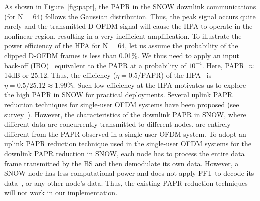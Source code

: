 As shown in Figure~\ref{fig:papr}, the PAPR in the SNOW downlink communications (for N = 64) follows the Gaussian distribution. Thus, the peak signal occurs quite rarely and the transmitted D-OFDM signal will cause the HPA to operate in the nonlinear region, resulting in a very inefficient amplification. To illustrate the power efficiency of the HPA for N = 64, let us assume the probability of the clipped D-OFDM frames is less than 0.01\%. We thus need to apply an input back-off (IBO)~\cite{baxley2004power} equivalent to the PAPR at a probability of $10^{-4}$. Here, PAPR $\approx$ 14dB or 25.12. Thus, the efficiency ($\eta = 0.5/\text{PAPR}$) of the HPA~\cite{jiang2008overview} is $\eta = 0.5/25.12 \approx 1.99\%$. Such low efficiency at the HPA motivates us to explore the high PAPR in SNOW for practical deployments.
Several uplink PAPR reduction techniques for single-user OFDM systems have been proposed (see survey~\cite{jiang2008overview}). However, the characteristics of the downlink PAPR in SNOW, where different data are concurrently transmitted to different nodes, are entirely different from the PAPR observed in a single-user OFDM system. To adopt an uplink PAPR reduction technique used in the single-user OFDM systems for the downlink PAPR reduction in SNOW, each node has to process the entire data frame transmitted by the BS and then demodulate its own data. However, a SNOW node has less computational power and does not apply FFT to decode its data~\cite{snow_ton}, or any other node's data. Thus, the existing PAPR reduction techniques will not work in our implementation.

